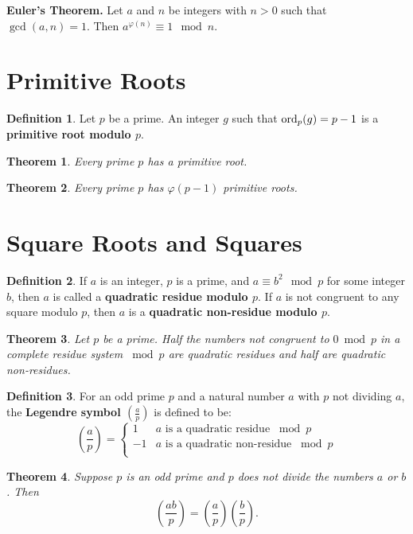 \documentclass[12pt]{amsart}
\theoremstyle{plain}
\newtheorem{thm}{Theorem}
\theoremstyle{definition}
\newtheorem*{defn}{Definition}
\theoremstyle{remark}
\begin{document}
\noindent\textbf{Euler's Theorem.} Let $a$ and $n$ be integers with $n > 0$ such that $\gcd(a,n) = 1$. Then $a^{\varphi(n)} \equiv 1 \mod n$.

\section{Primitive Roots}
\begin{defn} Let $p$ be a prime.  An integer $g$ such that $\textup{ord}_p(g) = p-1$ is a \textbf{primitive root modulo $p$}.
\end{defn}

\begin{thm}
Every prime $p$ has a primitive root.
\end{thm}

\begin{thm}
Every prime $p$ has $\varphi(p-1)$ primitive roots.
\end{thm}

\section{Square Roots and Squares}

\begin{defn} If $a$ is an integer, $p$ is a prime, and $a \equiv b^2 \mod p$ for some integer $b$, then $a$ is called a \textbf{quadratic residue modulo $p$}.  If $a$ is not congruent to any square modulo $p$, then $a$ is a \textbf{quadratic non-residue modulo $p$}.
\end{defn}

\begin{thm}
Let $p$ be a prime.  Half the numbers not congruent to $0 \bmod p$ in a complete residue system $\bmod p$ are quadratic residues and half are quadratic non-residues.
\end{thm}

\begin{defn} For an odd prime $p$ and a natural number $a$ with $p$ not dividing $a$, the \textbf{Legendre symbol $\left( \frac{a}{p}\right)$} is defined to be:
\[ \left( \frac{a}{p}\right) = \begin{cases} 
      1 & a \text{ is a quadratic residue } \bmod p \\
      -1 & a \text{ is a quadratic non-residue } \bmod p \\
   \end{cases}
\]
\end{defn}

\begin{thm}
Suppose $p$ is an odd prime and $p$ does not divide the numbers $a$ or $b$.  Then $$\left( \frac{ab}{p}\right) = \left( \frac{a}{p}\right)\left( \frac{b}{p}\right).$$
\end{thm}
\end{document}
